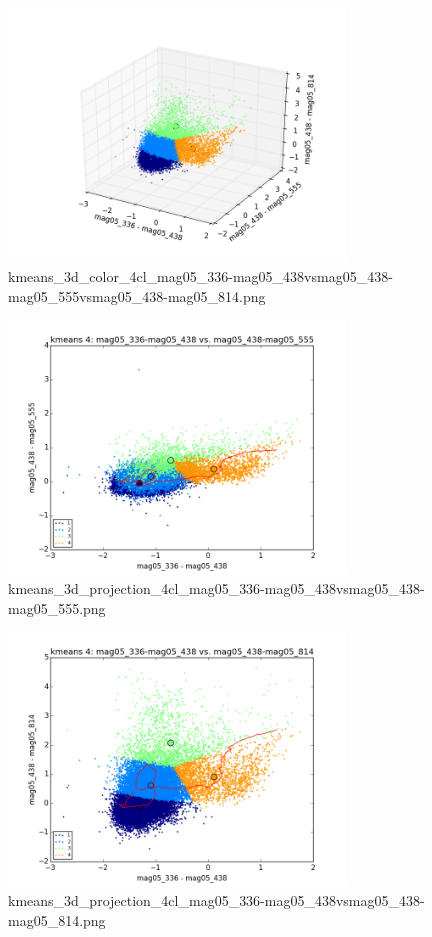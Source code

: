 \documentclass{article}%
\begin{document}
\begin{figure}%
\centering%
\includegraphics[width=0.8\textwidth]{kmeans_3d_color_4cl_mag05_336-mag05_438vsmag05_438-mag05_555vsmag05_438-mag05_814.png}%
\caption{kmeans\_3d\_color\_4cl\_mag05\_336{-}mag05\_438vsmag05\_438{-}mag05\_555vsmag05\_438{-}mag05\_814.png}%
\end{figure}

%


\begin{figure}%
\centering%
\includegraphics[width=0.8\textwidth]{kmeans_3d_projection_4cl_mag05_336-mag05_438vsmag05_438-mag05_555.png}%
\caption{kmeans\_3d\_projection\_4cl\_mag05\_336{-}mag05\_438vsmag05\_438{-}mag05\_555.png}%
\end{figure}

%


\begin{figure}%
\centering%
\includegraphics[width=0.8\textwidth]{kmeans_3d_projection_4cl_mag05_336-mag05_438vsmag05_438-mag05_814.png}%
\caption{kmeans\_3d\_projection\_4cl\_mag05\_336{-}mag05\_438vsmag05\_438{-}mag05\_814.png}%
\end{figure}

%
\newpage

%
\end{document}
